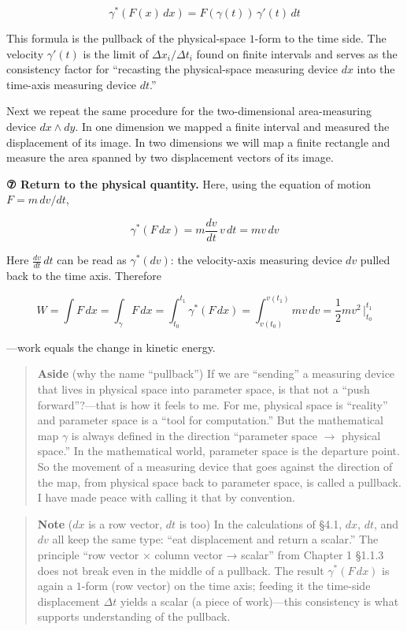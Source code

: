 \documentclass[a4paper,12pt,openany]{book}
\begin{document}
\[
\gamma^*(F(x)\,dx)
=
F(\gamma(t))\,\gamma'(t)\,dt
\]

This formula is the pullback of the physical-space \(1\)-form to the
time side. The velocity \(\gamma'(t)\) is the limit of
\(\Delta x_i/\Delta t_i\) found on finite intervals and serves as the
consistency factor for ``recasting the physical-space measuring device
\(dx\) into the time-axis measuring device \(dt\).''

Next we repeat the same procedure for the two-dimensional area-measuring
device \(dx\wedge dy\). In one dimension we mapped a finite interval and
measured the displacement of its image. In two dimensions we will map a
finite rectangle and measure the area spanned by two displacement
vectors of its image.

\textbf{⑦ Return to the physical quantity.} Here, using the equation of
motion \(F = m\,dv/dt\),

\[\gamma^*(F\,dx) = m\frac{dv}{dt}\,v\,dt = m v\,dv\]

Here \(\frac{dv}{dt}\,dt\) can be read as \(\gamma^*(dv)\): the
velocity-axis measuring device \(dv\) pulled back to the time axis.
Therefore

\[W = \int F\,dx = \int_{\gamma} F\,dx = \int_{t_0}^{t_1} \gamma^*(F\,dx) = \int_{v(t_0)}^{v(t_1)} m v\,dv = \frac{1}{2}mv^2\,\Big|_{t_0}^{t_1}\]

—work equals the change in kinetic energy.

\begin{quote}
\textbf{Aside} (why the name ``pullback'') If we are ``sending'' a
measuring device that lives in physical space into parameter space, is
that not a ``push forward''?—that is how it feels to me. For me,
physical space is ``reality'' and parameter space is a ``tool for
computation.'' But the mathematical map \(\gamma\) is always defined in
the direction ``parameter space \(\to\) physical space.'' In the
mathematical world, parameter space is the departure point. So the
movement of a measuring device that goes against the direction of the
map, from physical space back to parameter space, is called a pullback.
I have made peace with calling it that by convention.
\end{quote}

\begin{quote}
\textbf{Note} (\(dx\) is a row vector, \(dt\) is too) In the
calculations of §4.1, \(dx\), \(dt\), and \(dv\) all keep the same type:
``eat displacement and return a scalar.'' The principle ``row vector ×
column vector → scalar'' from Chapter 1 §1.1.3 does not break even in
the middle of a pullback. The result \(\gamma^*(F\,dx)\) is again a
\(1\)-form (row vector) on the time axis; feeding it the time-side
displacement \(\Delta t\) yields a scalar (a piece of work)—this
consistency is what supports understanding of the pullback.
\end{quote}
\end{document}

